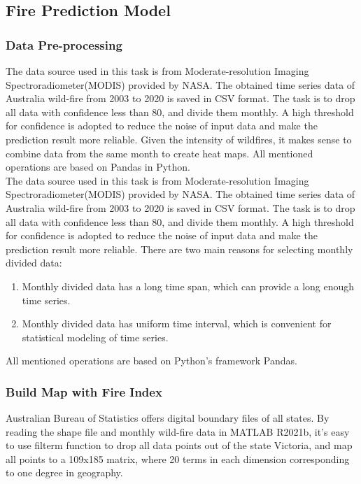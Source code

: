 \documentclass[../main]{subfiles}
\begin{document}
\subsection{Fire Prediction Model}

\hypertarget{data-pre-processing}{%
\subsubsection{Data Pre-processing}\label{data-pre-processing}}

The data source used in this task is from Moderate-resolution Imaging
Spectroradiometer(MODIS) provided by NASA. The obtained time series data
of Australia wild-fire from 2003 to 2020 is saved in CSV format. The
task is to drop all data with confidence less than 80, and divide them
monthly. A high threshold for confidence is adopted to reduce the noise
of input data and make the prediction result more reliable. Given the
intensity of wildfires, it makes sense to combine data from the same
month to create heat maps. All mentioned operations are based on Pandas
in Python.\\
The data source used in this task is from Moderate-resolution Imaging
Spectroradiometer(MODIS) provided by NASA. The obtained time series data
of Australia wild-fire from 2003 to 2020 is saved in CSV format. The
task is to drop all data with confidence less than 80, and divide them
monthly. A high threshold for confidence is adopted to reduce the noise
of input data and make the prediction result more reliable. There are
two main reasons for selecting monthly divided data:

\begin{enumerate}
\def\labelenumi{\arabic{enumi}.}
\item
  Monthly divided data has a long time span, which can provide a long
  enough time series.
\item
  Monthly divided data has uniform time interval, which is convenient
  for statistical modeling of time series.
\end{enumerate}

All mentioned operations are based on Python's framework Pandas.

\hypertarget{build-map-with-fire-index}{%
\subsubsection{Build Map with Fire
Index}\label{build-map-with-fire-index}}

Australian Bureau of Statistics offers digital boundary files of all
states. By reading the shape file and monthly wild-fire data in MATLAB
R2021b, it's easy to use filterm function to drop all data points out of
the state Victoria, and map all points to a 109x185 matrix, where 20
terms in each dimension corresponding to one degree in geography.
\end{document}
